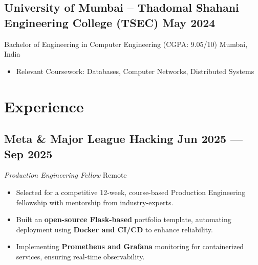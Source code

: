 \documentclass[a4,10pt]{article}
\newenvironment{zitemize}{
\begin{itemize}\itemsep0pt \parskip0pt \parsep1pt}
{\end{itemize}\vspace{-0.5cm}}
\begin{document}
\subsection*{University of Mumbai – Thadomal Shahani Engineering College (TSEC) \hfill May 2024}{\normalsize \normalfont Bachelor of Engineering in Computer Engineering (CGPA: 9.05/10) \hfill Mumbai, India}
\vspace{-0.2cm}
\begin{itemize}
    \item Relevant Coursework: Databases, Computer Networks, Distributed Systems
\end{itemize}
\vspace{-0.7cm}

\section{Experience}
\vspace{-0.1cm}

\subsection*{Meta \& Major League Hacking \hfill Jun 2025 --- Sep 2025}{\normalsize\normalfont \emph{Production Engineering Fellow}
\hfill Remote}
\vspace{-0.2cm}
\begin{zitemize}
  \item Selected for a competitive 12-week, course-based Production Engineering fellowship with mentorship from industry-experts.
  \item Built an \textbf{open-source Flask-based} portfolio template, automating deployment using \textbf{Docker and CI/CD} to enhance reliability.
  \item Implementing \textbf{Prometheus and Grafana} monitoring for containerized services, ensuring real-time observability.
\end{zitemize}
\vspace{-0.1cm}
\end{document}
